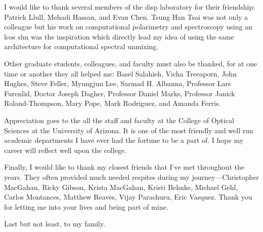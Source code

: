 I would like to thank several members of the \gls{disp} laboratory for their friendship: Patrick Llull, Mehadi Hassan, and Evan Chen. Tsung Han Tsai was not only a colleague but his work on computational polarimetry and spectroscopy using an \gls{lcos} \gls{slm} was the inspiration which directly lead my idea of using the same architecture for computational spectral unmixing. 

Other graduate students, colleagues, and faculty must also be thanked, for at one time or another they all helped me: Basel Salahieh, Vicha Treeaporn, John Hughes, Steve Feller, Myungjun Lee, Sarmad H. Albanna, Professor Lars Furenlid, Doctor Joseph Dagher, Professor Daniel Marks, Professor Janick Roland-Thompson, Mary Pope, Mark Rodriguez, and Amanda Ferris. 

Appreciation goes to the all the staff and faculty at the College of Optical Sciences at the University of Arizona. It is one of the most friendly and well run academic departments I have ever had the fortune to be a part of. I hope my career will reflect well upon the college. 

Finally, I would like to thank my closest friends that I've met throughout the years. They often provided much needed respites during my journey---Christopher MacGahan, Ricky Gibson, Krista MacGahan, Kristi Behnke, Michael Gehl, Carlos Montances, Matthew Reaves, Vijay Parachuru, Eric Vasquez. Thank you for letting me into your lives and being part of mine.

Last but not least, to my family. 